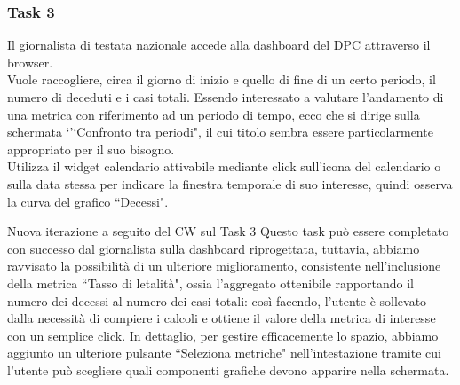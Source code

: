 \subsubsection{Task 3}
\label{sss:cw-task-3}

Il giornalista di testata nazionale accede alla dashboard del DPC attraverso il browser.\\
Vuole raccogliere, circa il giorno di inizio e quello di fine di un certo periodo, il numero di deceduti e i casi totali.
Essendo interessato a valutare l'andamento di una metrica con riferimento ad un periodo di tempo, ecco che si dirige sulla schermata `'`Confronto tra periodi", il cui titolo sembra essere particolarmente appropriato per il suo bisogno.\\
Utilizza il widget calendario attivabile mediante click sull'icona del calendario o sulla data stessa per indicare la finestra temporale di suo interesse, quindi osserva la curva del grafico ``Decessi".

\begin{bclogo}{Nuova iterazione a seguito del CW sul Task 3}
    Questo task può essere completato con successo dal giornalista sulla dashboard riprogettata, tuttavia, abbiamo ravvisato la possibilità di un ulteriore miglioramento, consistente nell'inclusione della metrica ``Tasso di letalità", ossia l'aggregato ottenibile rapportando il numero dei decessi al numero dei casi totali: così facendo, l'utente è sollevato dalla necessità di compiere i calcoli e ottiene il valore della metrica di interesse con un semplice click.
    In dettaglio, per gestire efficacemente lo spazio, abbiamo aggiunto un ulteriore pulsante ``Seleziona metriche" nell'intestazione tramite cui l'utente può scegliere quali componenti grafiche devono apparire nella schermata.
\end{bclogo}